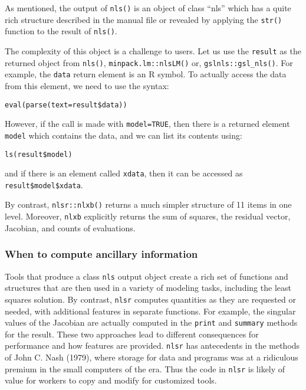As mentioned, the output of \texttt{nls()} is an object of class ``nls'' which has a quite rich structure
described in the manual file or revealed by applying the \texttt{str()} function to the
result of \texttt{nls()}.

The complexity of this object is a challenge to users. Let us use the
\texttt{result} as the returned object from \texttt{nls()}, \texttt{minpack.lm::nlsLM()} or,
\texttt{gslnls::gsl\_nls()}. For example, the \texttt{data} return element is an R symbol. To
actually access the data from this element, we need to use the syntax:

\begin{verbatim}
eval(parse(text=result$data))
\end{verbatim}

However, if the call is made with \texttt{model=TRUE}, then there is a returned element
\texttt{model} which contains the data, and we can list its contents using:

\begin{verbatim}
ls(result$model)
\end{verbatim}

and if there is an element called \texttt{xdata}, then it can be accessed as
\texttt{result\$model\$xdata}.

By contrast, \texttt{nlsr::nlxb()} returns a much simpler structure of 11 items
in one level. Moreover, \texttt{nlxb} explicitly returns the sum of squares, the residual vector, Jacobian, and counts of evaluations.

\hypertarget{when-to-compute-ancillary-information}{%
\subsubsection{When to compute ancillary information}\label{when-to-compute-ancillary-information}}

Tools that produce a class \texttt{nls} output object create a rich set of functions
and structures that are then used in a variety of modeling tasks, including the
least squares solution. By contrast,
\texttt{nlsr} computes quantities as they are requested or needed, with additional
features in separate functions. For example, the singular values of the Jacobian
are actually computed in the \texttt{print} and \texttt{summary} methods for the result.
These two approaches
lead to different consequences for performance and how features are
provided. \texttt{nlsr} has antecedents in the methods of John C. Nash (1979), where storage for
data and programs was at a ridiculous premium in the small computers of the era.
Thus the code in \texttt{nlsr} is likely of value for workers to copy and modify
for customized tools.

